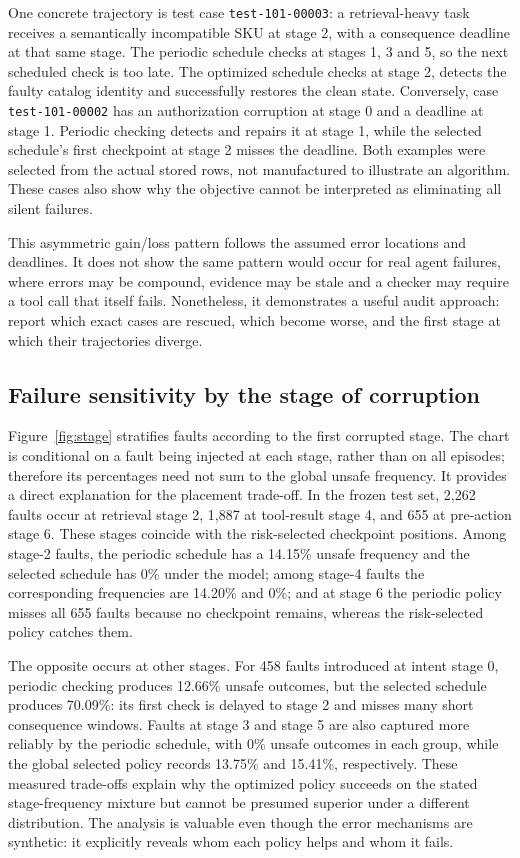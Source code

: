 \documentclass[conference]{IEEEtran}
\begin{document}
One concrete trajectory is test case \texttt{test-101-00003}: a retrieval-heavy task receives a semantically incompatible SKU at stage 2, with a consequence deadline at that same stage. The periodic schedule checks at stages 1, 3 and 5, so the next scheduled check is too late. The optimized schedule checks at stage 2, detects the faulty catalog identity and successfully restores the clean state. Conversely, case \texttt{test-101-00002} has an authorization corruption at stage 0 and a deadline at stage 1. Periodic checking detects and repairs it at stage 1, while the selected schedule's first checkpoint at stage 2 misses the deadline. Both examples were selected from the actual stored rows, not manufactured to illustrate an algorithm. These cases also show why the objective cannot be interpreted as eliminating all silent failures.

This asymmetric gain/loss pattern follows the assumed error locations and deadlines. It does not show the same pattern would occur for real agent failures, where errors may be compound, evidence may be stale and a checker may require a tool call that itself fails. Nonetheless, it demonstrates a useful audit approach: report which exact cases are rescued, which become worse, and the first stage at which their trajectories diverge.

\subsection{Failure sensitivity by the stage of corruption}
Figure~\ref{fig:stage} stratifies faults according to the first corrupted stage. The chart is conditional on a fault being injected at each stage, rather than on all episodes; therefore its percentages need not sum to the global unsafe frequency. It provides a direct explanation for the placement trade-off. In the frozen test set, 2,262 faults occur at retrieval stage 2, 1,887 at tool-result stage 4, and 655 at pre-action stage 6. These stages coincide with the risk-selected checkpoint positions. Among stage-2 faults, the periodic schedule has a 14.15\% unsafe frequency and the selected schedule has 0\% under the model; among stage-4 faults the corresponding frequencies are 14.20\% and 0\%; and at stage 6 the periodic policy misses all 655 faults because no checkpoint remains, whereas the risk-selected policy catches them.

The opposite occurs at other stages. For 458 faults introduced at intent stage 0, periodic checking produces 12.66\% unsafe outcomes, but the selected schedule produces 70.09\%: its first check is delayed to stage 2 and misses many short consequence windows. Faults at stage 3 and stage 5 are also captured more reliably by the periodic schedule, with 0\% unsafe outcomes in each group, while the global selected policy records 13.75\% and 15.41\%, respectively. These measured trade-offs explain why the optimized policy succeeds on the stated stage-frequency mixture but cannot be presumed superior under a different distribution. The analysis is valuable even though the error mechanisms are synthetic: it explicitly reveals whom each policy helps and whom it fails.
\end{document}
